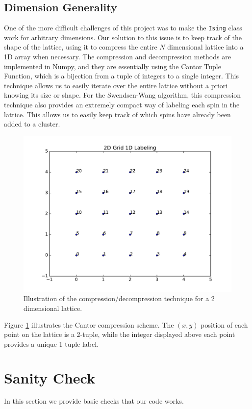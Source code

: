 \documentclass[a4paper]{article}
\begin{document}
\subsection{Dimension Generality}

One of the more difficult challenges of this project was to make the \texttt{Ising} class work for arbitrary dimensions. Our solution to this issue is to keep track of the shape of the lattice, using it to compress the entire $N$ dimensional lattice into a 1D array when necessary. The compression and decompression methods are implemented in Numpy, and they are essentially using the Cantor Tuple Function, which is a bijection from a tuple of integers to a single integer. This technique allows us to easily iterate over the entire lattice without a priori knowing its size or shape. For the Swendsen-Wang algorithm, this compression technique also provides an extremely compact way of labeling each spin in the lattice. This allows us to easily keep track of which spins have already been added to a cluster.


\begin{figure}[htb!]
	\centering \includegraphics[width=\linewidth]{compress.pdf}
	\caption{Illustration of the compression/decompression technique for a 2 dimensional lattice. }
	\label{fig:cantor}
\end{figure}
Figure \ref{fig:cantor} illustrates the Cantor compression scheme. The $(x,y)$ position of each point on the lattice is a 2-tuple, while the integer displayed above each point provides a unique 1-tuple label.

\section{Sanity Check}
In this section we provide basic checks that our code works.
\end{document}
